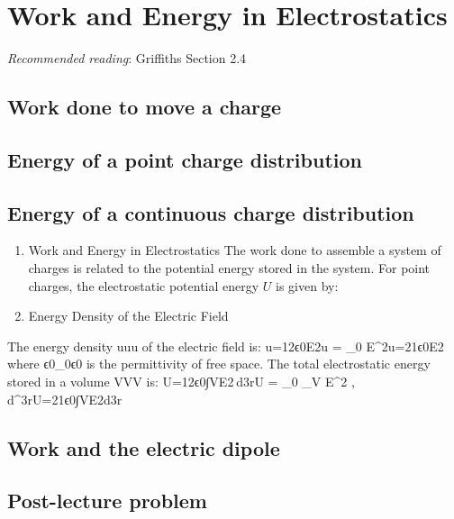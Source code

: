 \documentclass[
  letterpaper,
  DIV=11,
  numbers=noendperiod]{scrreprt}
\begin{document}

\chapter{Work and Energy in
Electrostatics}\label{work-and-energy-in-electrostatics}

\emph{Recommended reading}: Griffiths Section 2.4

\section{Work done to move a charge}\label{work-done-to-move-a-charge}

\section{Energy of a point charge
distribution}\label{energy-of-a-point-charge-distribution}

\section{Energy of a continuous charge
distribution}\label{energy-of-a-continuous-charge-distribution}

\begin{enumerate}
\def\labelenumi{\arabic{enumi}.}
\setcounter{enumi}{9}
\item
  Work and Energy in Electrostatics The work done to assemble a system
  of charges is related to the potential energy stored in the system.
  For point charges, the electrostatic potential energy \(U\) is given
  by:
\item
  Energy Density of the Electric Field
\end{enumerate}

The energy density uuu of the electric field is: u=12ϵ0E2u = 
\epsilon\_0 E\^{}2u=21ϵ0E2 where ϵ0\epsilon\_0ϵ0 is the permittivity of
free space. The total electrostatic energy stored in a volume VVV is:
U=12ϵ0∫VE2 d3rU =  \epsilon\_0 \int\_V E\^{}2 ,
d\^{}3rU=21ϵ0∫VE2d3r

\section{Work and the electric
dipole}\label{work-and-the-electric-dipole}

\section{Post-lecture problem}\label{post-lecture-problem-2}
\end{document}
